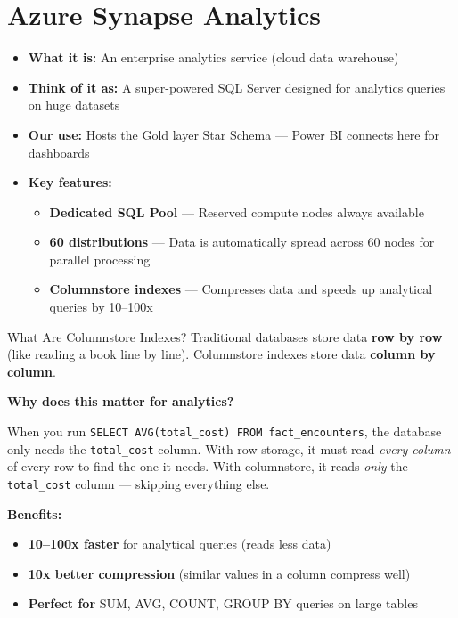 \documentclass[12pt, a4paper, oneside]{report}
\begin{document}
\section{Azure Synapse Analytics}

\begin{itemize}
    \item \textbf{What it is:} An enterprise analytics service (cloud data warehouse)
    \item \textbf{Think of it as:} A super-powered SQL Server designed for analytics queries on huge datasets
    \item \textbf{Our use:} Hosts the Gold layer Star Schema --- Power BI connects here for dashboards
    \item \textbf{Key features:}
    \begin{itemize}
        \item \textbf{Dedicated SQL Pool} --- Reserved compute nodes always available
        \item \textbf{60 distributions} --- Data is automatically spread across 60 nodes for parallel processing
        \item \textbf{Columnstore indexes} --- Compresses data and speeds up analytical queries by 10--100x
    \end{itemize}
\end{itemize}

\begin{conceptbox}{What Are Columnstore Indexes?}
Traditional databases store data \textbf{row by row} (like reading a book line by line). Columnstore indexes store data \textbf{column by column}.

\textbf{Why does this matter for analytics?}

When you run \texttt{SELECT AVG(total\_cost) FROM fact\_encounters}, the database only needs the \texttt{total\_cost} column. With row storage, it must read \textit{every column} of every row to find the one it needs. With columnstore, it reads \textit{only} the \texttt{total\_cost} column --- skipping everything else.

\textbf{Benefits:}
\begin{itemize}
    \item \textbf{10--100x faster} for analytical queries (reads less data)
    \item \textbf{10x better compression} (similar values in a column compress well)
    \item \textbf{Perfect for} SUM, AVG, COUNT, GROUP BY queries on large tables
\end{itemize}
\end{conceptbox}
\end{document}
